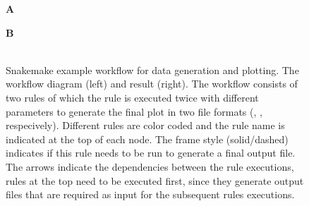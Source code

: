 \begin{figure}
    \begin{minipage}[t]{0.4\textwidth}
    \textbf{A}\\
    
    \end{minipage}
    \begin{minipage}[t]{0.6\textwidth}
    \textbf{B}\\
    \\
    \end{minipage}
 \caption[Snakemake example workflow for data generation and plotting]{Snakemake example workflow for data generation and plotting. The workflow diagram (left) and result (right). The workflow consists of two rules of which the  rule is executed twice with different parameters to generate the final plot in two file formats (, , respecively). Different rules are color coded and the rule name is indicated at the top of each node. The frame style (solid/dashed) indicates if this rule needs to be run to generate a final output file. The arrows indicate the dependencies between the rule executions, rules at the top need to be executed first, since they generate output files that are required as input for the subsequent rules executions.}
\label{fig:python_demo}
\end{figure}


